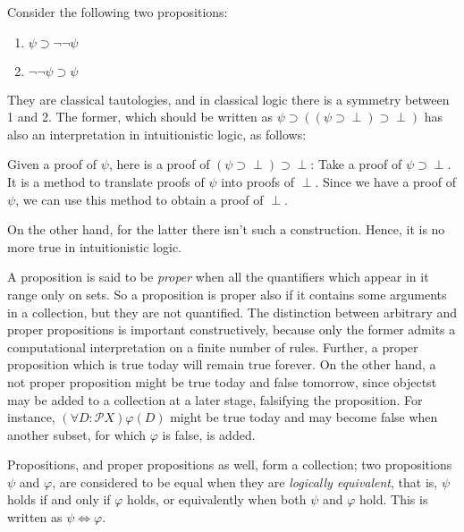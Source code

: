 \begin{example}
  Consider the following two propositions:
  \begin{enumerate}
  \item $\psi\supset\neg\neg\psi$
  \item $\neg\neg\psi\supset\psi$
  \end{enumerate}
  They are classical tautologies, and in classical logic there is a symmetry
  between 1 and 2. The former, which should be written as
  $\psi\supset((\psi\supset\perp)\supset\perp)$ has also an interpretation in
  intuitionistic logic, as follows:
  \begin{center}
    Given a proof of $\psi$, here is a proof of
    $(\psi\supset\perp)\supset\perp$: Take a proof of $\psi\supset\perp$. It is
    a method to translate proofs of $\psi$ into proofs of $\perp$. Since we have
    a proof of $\psi$, we can use this method to obtain a proof of $\perp$.
  \end{center}
  On the other hand, for the latter there isn't such a construction. Hence, it
  is no more true in intuitionistic logic.
\end{example}

A proposition is said to be \textit{proper} when all the quantifiers which
appear in it range only on sets. So a proposition is proper also if it contains
some arguments in a collection, but they are not quantified. The distinction
between arbitrary and proper propositions is important constructively, because
only the former admits a computational interpretation on a finite number of
rules. Further, a proper proposition which is true today will remain true
forever. On the other hand, a not proper proposition might be true today and
false tomorrow, since objectst may be added to a collection at a later stage,
falsifying the proposition. For instance, $(\forall D : \mathcal{P}X)\varphi(D)$
might be true today and may become false when another subset, for which
$\varphi$ is false, is added.

Propositions, and proper propositions as well, form a collection; two
propositions $\psi$ and $\varphi$, are considered to be equal when they are
\textit{logically equivalent}, that is, $\psi$ holds if and only if $\varphi$
holds, or equivalently when both $\psi$ and $\varphi$ hold. This is written as
$\psi \iff \varphi$.


